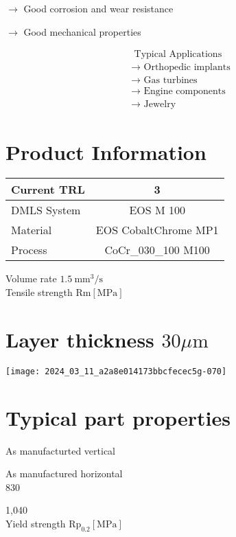 \documentclass[10pt]{article}
\begin{document}
$\longrightarrow$ Good corrosion and wear resistance

$\longrightarrow$ Good mechanical properties

$$
\begin{aligned}
& \text { Typical Applications } \\
& \longrightarrow \text { Orthopedic implants } \\
& \longrightarrow \text { Gas turbines } \\
& \longrightarrow \text { Engine components } \\
& \longrightarrow \text { Jewelry }
\end{aligned}
$$

\section*{Product Information}
\begin{center}
\begin{tabular}{l|c}
\hline
Current TRL & 3 \\
\hline
DMLS System & EOS M 100 \\
\hline
Material & EOS CobaltChrome MP1 \\
\hline
Process & CoCr\_030\_100 M100 \\
\hline
\end{tabular}
\end{center}

Volume rate $1.5 \mathrm{~mm}^{3} / \mathrm{s}$\\
Tensile strength $\mathrm{Rm}[\mathrm{MPa}]$

\section*{Layer thickness $30 \mu \mathrm{m}$}
\begin{center}
\texttt{[image: 2024\_03\_11\_a2a8e014173bbcfecec5g-070]}
\end{center}

\section*{Typical part properties}
As manufacturted vertical

As manufactured horizontal\\
830

1,040\\
Yield strength $\mathrm{Rp}_{0.2}[\mathrm{MPa}]$
\end{document}
